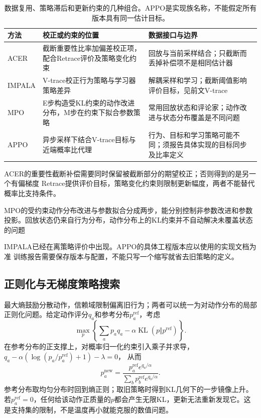 \begin{table}[t]
  \centering
  \small
  \begin{tabularx}{\linewidth}{>{\raggedright\arraybackslash}p{17mm} >{\raggedright\arraybackslash}X >{\raggedright\arraybackslash}X}
    \toprule
    方法 & 校正或约束的位置 & 数据接口与边界 \\
    \midrule
    ACER & 截断重要性比率加偏差校正项，配合Retrace评价及策略变化约束 & 回放与当前采样结合；只截断而丢掉补偿项不是相同估计器 \\
    IMPALA & V-trace校正行为策略与学习器策略差异 & 解耦采样和学习；截断阈值影响评价目标，见前文V-trace \\
    MPO & E步构造受KL约束的动作改进分布，M步在约束下拟合参数策略 & 常用回放状态和评论家；动作改进与状态分布覆盖是不同问题 \\
    APPO & 异步采样下结合V-trace目标与近端概率比代理 & 行为、目标和学习策略可能不同；须报告具体实现的目标同步及比率定义 \\
    \bottomrule
  \end{tabularx}
  \caption{数据复用、策略滞后和更新约束的几种组合。APPO是实现族名称，不能假定所有版本具有同一估计目标。}
  \label{tab:rl-learning-off-policy-actors}
\end{table}

ACER的重要性截断补偿需要同时保留被截断部分的期望校正；否则得到的是另一个有偏梯度
Retrace提供评价目标，策略变化约束则限制更新幅度，两者不能替代概率比支持条件。

MPO的受约束动作分布改进与参数拟合分成两步，能分别控制非参数改进和参数投影。回放状态仍来自行为分布，动作分布上的KL约束并不自动解决未覆盖状态的问题

IMPALA已经在离策略评价中出现。APPO的具体工程版本应以使用的实现文档为准
训练报告需要保存版本与配置，不能只写一个缩写就省去旧策略的定义。

\subsection{正则化与无梯度策略搜索}
\label{sec:rl-learning-regularized-search}

最大熵鼓励分散动作，信赖域限制偏离旧行为；两者可以统一为对动作分布的局部正则化问题。给定动作评分$q_a$和参考分布$p_a^{\mathrm{ref}}$，考虑
\[
  \max_p\left\{\sum_a p_a q_a
          -\alpha\operatorname{KL}(p\Vert p^{\mathrm{ref}})\right\}.
\]
在参考分布的正支撑上，对概率归一化约束引入乘子并求导，
$q_a-\alpha(\log(p_a/p_a^{\mathrm{ref}})+1)-\lambda=0$，
从而
\begin{equation}
  p_a^{\mathrm{new}}
     =\frac{p_a^{\mathrm{ref}}e^{q_a/\alpha}}
            {\sum_b p_b^{\mathrm{ref}}e^{q_b/\alpha}}.
  \label{eq:rl-learning-exponential-update}
\end{equation}
参考分布取均匀分布时回到熵正则；取旧策略时得到KL几何下的一步镜像上升。若$p_a^{\mathrm{ref}}=0$，任何给该动作正质量的$p$都会产生无限KL，更新无法重新发现它。这是支持集的限制，不是温度再小就能克服的数值问题。

